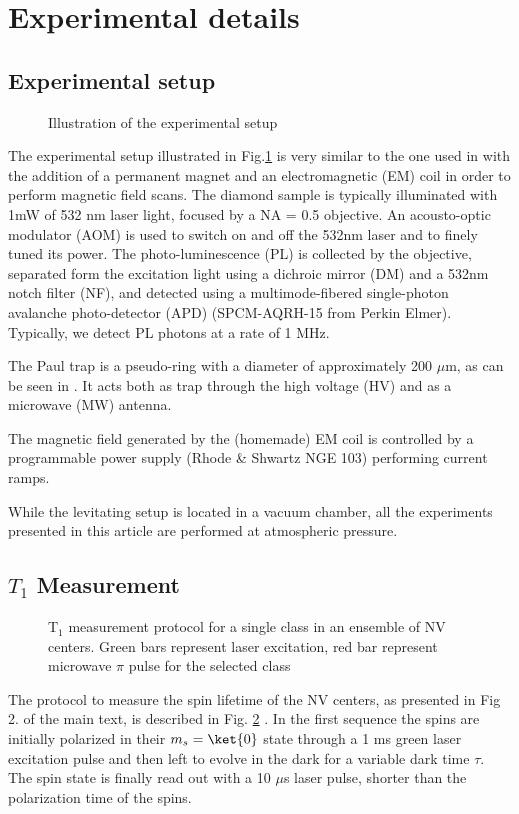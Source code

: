 \documentclass[preprintnumbers,amsmath,amssymb,onecolumn,12pt]{revtex4}
\begin{document}
\section{Experimental details}

\subsection{Experimental setup}

\begin{figure}[!ht]
  \centering {}
  \caption{Illustration of the experimental setup}
	\label{Optics}
\end{figure}

The experimental setup illustrated in Fig.\ref{Optics} is very similar to the one used in \citep{DelordPRL} with the addition of a permanent magnet and an electromagnetic (EM) coil in order to perform magnetic field scans. The diamond sample is typically illuminated with 1mW of 532 nm laser light, focused by a NA = 0.5 objective. An acousto-optic modulator (AOM) is used to switch on and off the 532nm laser and to finely tuned its power. The photo-luminescence (PL) is collected by the objective, separated form the excitation light using a dichroic mirror (DM) and a 532nm notch filter (NF), and detected using a multimode-fibered single-photon avalanche photo-detector (APD) (SPCM-AQRH-15 from Perkin Elmer). Typically, we detect PL photons at a rate of 1 MHz. 

The Paul trap is a pseudo-ring with a diameter of approximately 200 $\mu$m, as can be seen in \citep{DelordPhD}. It acts both as trap through the high voltage (HV) and as a microwave (MW) antenna.

The magnetic field generated by the (homemade) EM coil is controlled by a programmable power supply (Rhode \& Shwartz NGE 103) performing current ramps.

While the levitating setup is located in a vacuum chamber, all the experiments presented in this article are performed at atmospheric pressure.


\subsection{$T_1$ Measurement}
\begin{figure}[!ht]
  \centering {}
  \caption{T$_1$ measurement protocol for a single class in an ensemble of NV centers. Green bars represent laser excitation, red bar represent microwave $\pi$ pulse for the selected class}
	\label{T1_protocol}
\end{figure}
The protocol to measure the spin lifetime of the NV centers, as presented in Fig 2. of the main text, is described in Fig. \ref{T1_protocol} . In the first sequence the spins are initially polarized in their $m_s=\ket{0}$ state through a 1 ms green laser excitation pulse and then left to evolve in the dark for a variable dark time $\tau$. The spin state is finally read out with a 10 $\mu$s laser pulse, shorter than the polarization time of the spins.
\end{document}
